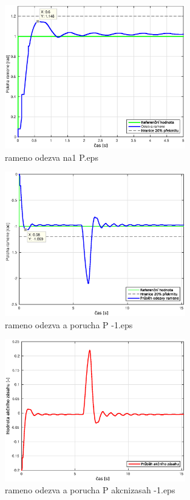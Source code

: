 \documentclass[11pt,a4paper]{article}
\begin{document}
\begin{figure}[H]
\centering
\includegraphics[width=0.7\textwidth]{dobre_grafy/rameno_odezva_na1_P.eps}
\caption{rameno odezva na1 P.eps}
\label{ram_p_1_akc}
\end{figure}

\begin{figure}[H]
\centering
\includegraphics[width=0.7\textwidth]{dobre_grafy/rameno_odezva_a_porucha_P_-1.eps}
\caption{rameno odezva a porucha P -1.eps}
\label{ram_p_-1}
\end{figure}

\begin{figure}[H]
\centering
\includegraphics[width=0.7\textwidth]{dobre_grafy/rameno_odezva_a_porucha_P_akcnizasah_-1.eps}
\caption{rameno odezva a porucha P akcnizasah -1.eps}
\label{ram_p_-1_akc}
\end{figure}
\end{document}

